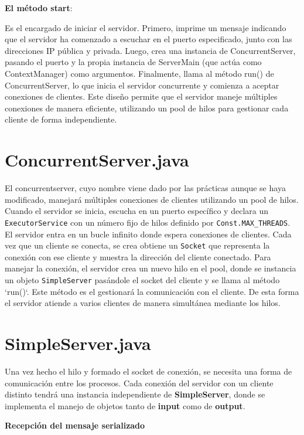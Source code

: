 \documentclass[a4paper, 12pt]{report}
\begin{document}
\textbf{El método start}:

Es el encargado de iniciar el servidor. Primero, imprime un mensaje
indicando que el servidor ha comenzado a escuchar en el puerto
especificado, junto con las direcciones IP pública y privada. Luego,
crea una instancia de ConcurrentServer, pasando el puerto y la propia instancia de ServerMain (que actúa como ContextManager) como argumentos. Finalmente, llama al método run() de ConcurrentServer,
lo que inicia el servidor concurrente y comienza a aceptar conexiones
de clientes. Este diseño permite que el servidor maneje múltiples
conexiones de manera eficiente, utilizando un pool de hilos para
gestionar cada cliente de forma independiente.



\section{ConcurrentServer.java}

El concurrentserver, cuyo nombre viene dado por las prácticas aunque se haya modificado, manejará múltiples
conexiones de clientes utilizando un pool de hilos. Cuando el servidor se inicia, escucha en un puerto
específico y declara un \texttt{ExecutorService}  con un número fijo de hilos definido por
\texttt{Const.MAX\_THREADS}. El servidor entra en un bucle infinito donde espera conexiones de clientes. Cada
vez que un cliente se conecta, se crea obtiene un \texttt{Socket} que
representa la conexión con ese cliente y muestra la dirección del cliente
conectado. Para manejar la conexión, el servidor crea un nuevo hilo en el pool, donde se instancia un
objeto \texttt{SimpleServer} pasándole el socket del cliente y se llama al método `run()`. Este método es el
gestionará la comunicación con el cliente. De esta forma el servidor atiende a varios
clientes de manera simultánea mediante los hilos.

\section{SimpleServer.java}

Una vez hecho el hilo y formado el socket de conexión, se necesita una forma de comunicación entre los procesos. Cada conexión del servidor con un cliente distinto tendrá una instancia independiente de \textbf{SimpleServer}, donde se implementa el manejo de objetos tanto de \textbf{input} como de \textbf{output}.

\textbf{Recepción del mensaje serializado}
\end{document}
